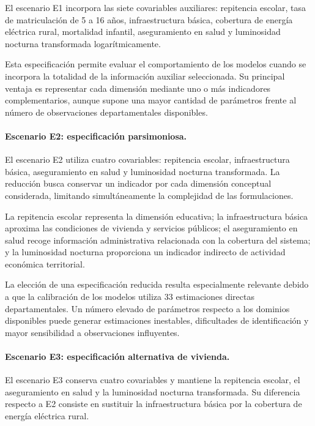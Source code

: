 El escenario E1 incorpora las siete covariables auxiliares: repitencia escolar, tasa de matriculación de 5 a 16 años, infraestructura básica, cobertura de energía eléctrica rural, mortalidad infantil, aseguramiento en salud y luminosidad nocturna transformada logarítmicamente.

Esta especificación permite evaluar el comportamiento de los modelos cuando se incorpora la totalidad de la información auxiliar seleccionada. Su principal ventaja es representar cada dimensión mediante uno o más indicadores complementarios, aunque supone una mayor cantidad de parámetros frente al número de observaciones departamentales disponibles.

\paragraph{Escenario E2: especificación parsimoniosa.}

El escenario E2 utiliza cuatro covariables: repitencia escolar, infraestructura básica, aseguramiento en salud y luminosidad nocturna transformada. La reducción busca conservar un indicador por cada dimensión conceptual considerada, limitando simultáneamente la complejidad de las formulaciones.

La repitencia escolar representa la dimensión educativa; la infraestructura básica aproxima las condiciones de vivienda y servicios públicos; el aseguramiento en salud recoge información administrativa relacionada con la cobertura del sistema; y la luminosidad nocturna proporciona un indicador indirecto de actividad económica territorial.

La elección de una especificación reducida resulta especialmente relevante debido a que la calibración de los modelos utiliza 33 estimaciones directas departamentales. Un número elevado de parámetros respecto a los dominios disponibles puede generar estimaciones inestables, dificultades de identificación y mayor sensibilidad a observaciones influyentes.

\paragraph{Escenario E3: especificación alternativa de vivienda.}

El escenario E3 conserva cuatro covariables y mantiene la repitencia escolar, el aseguramiento en salud y la luminosidad nocturna transformada. Su diferencia respecto a E2 consiste en sustituir la infraestructura básica por la cobertura de energía eléctrica rural.

